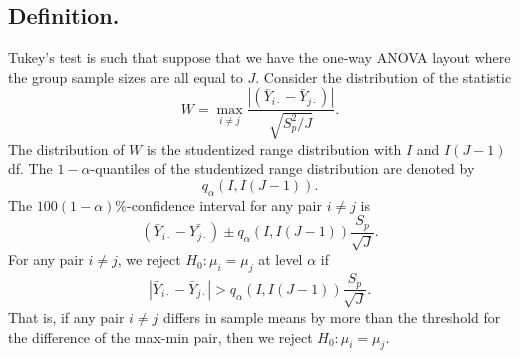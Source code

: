 \documentclass[titlepage]{article}
\begin{document}
\subsection{Definition.} Tukey's test is such that suppose that we have the one-way ANOVA layout where the group sample sizes are all equal to $J$. Consider the distribution of the statistic 
$$W = \max_{i \neq j}\frac{|(\bar{Y}_{i\cdot} - \bar{Y}_{j\cdot})|}{\sqrt{S_{p}^{2}/J}}.$$
The distribution of $W$ is the studentized range distribution with $I$ and $I(J-1)$ df. The $1-\alpha$-quantiles of the studentized range distribution are denoted by 
$$q_{\alpha}(I, I(J-1)).$$
The $100(1-\alpha)\%$-confidence interval for any pair $i \neq j$ is 
$$(\bar{Y}_{i\cdot} - \bar{Y_{j\cdot}}) \pm q_{\alpha}(I, I(J-1))\frac{S_{p}}{\sqrt{J}}.$$
For any pair $i \neq j$, we reject $H_{0}: \mu_{i} = \mu_{j}$ at level $\alpha$ if
$$|\bar{Y}_{i\cdot} - \bar{Y}_{j\cdot}| > q_{\alpha}(I, I(J-1))\frac{S_{p}}{\sqrt{J}}.$$
That is, if any pair $i \neq j$ differs in sample means by more than the threshold for the difference of the max-min pair, then we reject $H_{0}: \mu_{i} = \mu_{j}$.
\end{document}
